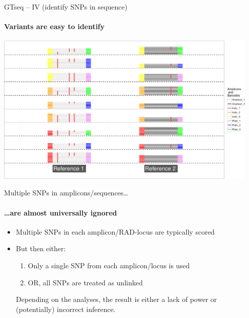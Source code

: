 \documentclass[letter,graphicx]{beamer}
\begin{document}
\begin{frame}{GTseq -- IV (identify SNPs in sequence)}
\framesubtitle{Variants are easy to identify}
\begin{center}
\includegraphics[width=0.95\textwidth]{figs/gtseq-snps-crop.pdf}
\end{center}
\end{frame}




\begin{frame}{Multiple SNPs in amplicons/sequences\ldots}
\framesubtitle{\ldots are almost universally ignored }
\begin{itemize}
\item Multiple SNPs in each amplicon/RAD-locus are typically scored
\item But then either:
\begin{enumerate}
\item Only a single SNP from each amplicon/locus is used
\item OR, all SNPs are treated as unlinked
\end{enumerate}
Depending on the analyses, the result is either a lack of power or (potentially) incorrect inference.
\end{itemize}
\end{frame}
\end{document}
